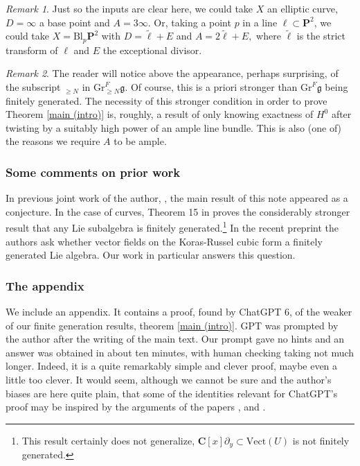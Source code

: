 \documentclass[12pt, oneside]{amsart}       %
\theoremstyle{remark}
\newtheorem*{remark}{Remark}
\renewcommand{\geq}{\geqslant}
\newcommand{\g}{\mathfrak{g}}
\begin{document}
\begin{remark} Just so the inputs are clear here, we could take $X$ an elliptic curve, $D=\infty$ a base point and $A=3\infty$. Or, taking a point $p$ in a line $\ell\subset \mathbf{P}^2$, we could take $X=\mathrm{Bl}_p\mathbf{P}^2$ with $D=\tilde{\ell}+E$ and $A=2\tilde{\ell}+E,$ where $\tilde{\ell}$ is the strict transform of $\ell$ and $E$ the exceptional divisor.\end{remark}

\begin{remark} The reader will notice above the appearance, perhaps surprising, of the subscript $_{\geq N}$ in $\mathrm{Gr}^F_{\geq N}\g$. Of course, this is a priori stronger than $\mathrm{Gr}^F\g$ being finitely generated. The necessity of this stronger condition in order to prove Theorem \ref{main (intro)} is, roughly, a result of only knowing exactness of $H^0$ after twisting by a suitably high power of an ample line bundle. This is also (one of) the reasons we require $A$ to be ample.  \end{remark}




\subsubsection{Some comments on prior work} In previous joint work of the author, \cite{BB}, the main result of this note appeared as a conjecture. In the case of curves, Theorem 15 in \cite{Mathieu} proves the considerably stronger result that any Lie subalgebra is finitely generated.\footnote{This result certainly does not generalize, $\mathbf{C}[x]\partial_y\subset\mathrm{Vect}(U)$ is not finitely generated.} In the recent preprint \cite{AR} the authors ask whether vector fields on the Koras-Russel cubic form a finitely generated Lie algebra. Our work in particular answers this question.

\subsubsection{The appendix} We include an appendix. It contains a proof, found by ChatGPT 6, of the weaker of our finite generation results, theorem \ref{main (intro)}. GPT was prompted by the author after the writing of the main text. Our prompt gave no hints and an answer was obtained in about ten minutes, with human checking taking not much longer. Indeed, it is a quite remarkably simple and clever proof, maybe even a little too clever.   It would seem, although we cannot be sure and the author's biases are here quite plain, that some of the identities relevant for ChatGPT's proof may be inspired by the arguments of the papers \cite{BF18}, \cite{BF16} and \cite{BR23}.
\end{document}
